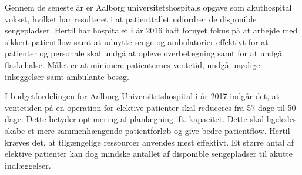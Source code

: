 
\noindent
Gennem de seneste år er Aalborg universitetshospitals opgave som akuthospital vokset, hvilket har resulteret i at patienttallet udfordrer de disponible sengepladser\cite{Handleplan2015}. Hertil har hospitalet i år 2016 haft fornyet fokus på at arbejde med sikkert patientflow samt at udnytte senge og ambulatorier effektivt for at patienter og personale skal undgå at opleve overbelægning samt for at undgå flaskehalse\cite{Handleplan2016}. Målet er at minimere patienternes ventetid, undgå unødige inlæggelser samt ambulante besøg\cite{Handleplan2016}. 

\noindent
I budgetfordelingen for Aalborg Universitetshospital i år 2017 indgår det, at ventetiden på en operation for elektive patienter skal reduceres fra 57 dage til 50 dage. \cite{Budget2016} Dette betyder optimering af planlægning ift. kapacitet. Dette skal ligeledes skabe et mere sammenhængende patientforløb og give bedre patientflow. Hertil kræves det, at tilgængelige ressourcer anvendes mest effektivt\cite{Handleplan2015}. Et større antal af elektive patienter kan dog mindske antallet af disponible sengepladser til akutte indlæggelser. 







